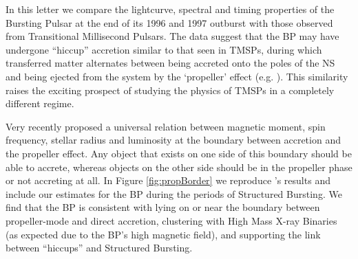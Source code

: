\par In this letter we compare the lightcurve, spectral and timing properties of the Bursting Pulsar at the end of its 1996 and 1997 outburst with those observed from Transitional Millisecond Pulsars. The data suggest that the BP may have undergone ``hiccup'' accretion similar to that seen in TMSPs, during which transferred matter alternates between being accreted onto the poles of the NS and being ejected from the system by the `propeller' effect (e.g. \citealp{Ferrigno_TMSPVar}). This similarity raises the exciting prospect of studying the physics of TMSPs in a completely different regime.

%
%

\par Very recently \citealp{Campana_PropBorder} proposed a universal relation between magnetic moment, spin frequency, stellar radius and luminosity at the boundary between accretion and the propeller effect. Any object that exists on one side of this boundary should be able to accrete, whereas objects on the other side should be in the propeller phase or not accreting at all. In Figure \ref{fig:propBorder} we reproduce \citealp{Campana_PropBorder}'s results and include our estimates for the BP during the periods of Structured Bursting. We find that the BP is consistent with lying on or near the boundary between propeller-mode and direct accretion, clustering with High Mass X-ray Binaries (as expected due to the BP's high magnetic field), and supporting the link between ``hiccups'' and Structured Bursting.

